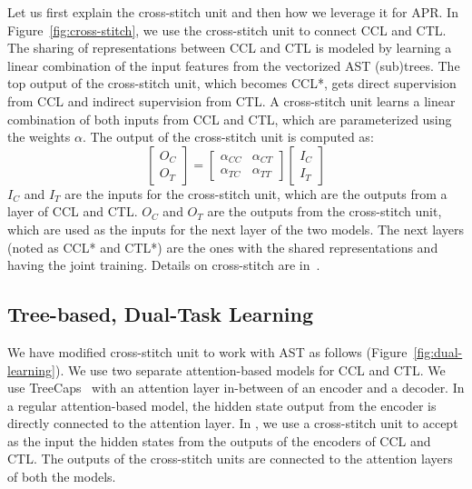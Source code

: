 Let us first explain the cross-stitch unit and then how we leverage it
for APR. In Figure~\ref{fig:cross-stitch},
we use the cross-stitch unit to connect CCL and CTL. The sharing of
representations between CCL and CTL is modeled by learning a linear
combination of the input features from the vectorized AST
(sub)trees. The top output of the cross-stitch unit, which becomes
CCL*, gets direct supervision from CCL and indirect supervision from
CTL.
A cross-stitch unit learns a linear combination of both inputs from
CCL and CTL, which are parameterized using the weights $\alpha$. The
output of the cross-stitch unit is computed as:
\begin{equation}\label{eq:cross-stitch}
	\begin{bmatrix}
		O_C\\
		O_T
	\end{bmatrix}
	=
	\begin{bmatrix}
		\alpha_{CC} &  \alpha_{CT} \\
		\alpha_{TC} &  \alpha_{TT}
	\end{bmatrix}
	\begin{bmatrix}
		I_C\\
		I_T
	\end{bmatrix}
\end{equation}
$I_C$ and $I_T$ are the inputs for the cross-stitch unit, which are
the outputs from a layer of CCL and CTL. $O_C$ and $O_T$ are the
outputs from the cross-stitch unit, which are used as the inputs
for the next layer of the two models.
The next layers (noted as CCL* and CTL*) are the ones with the shared
representations and having the joint training. Details on
cross-stitch are in~\cite{misra2016cross}.

\subsection{Tree-based, Dual-Task Learning}



We have modified cross-stitch unit to work with AST as follows
(Figure~\ref{fig:dual-learning}). We use two separate attention-based
 models for CCL and CTL. We use
TreeCaps~\cite{bui2021treecaps} with an attention layer in-between of
an encoder and a decoder. In a regular attention-based 
model, the hidden state output from the encoder is directly connected
to the attention layer. In {\tool}, we use a cross-stitch unit to
accept as the input the hidden states from the outputs of the encoders
of CCL and CTL. The outputs of the cross-stitch units are connected to
the attention layers of both the models.


